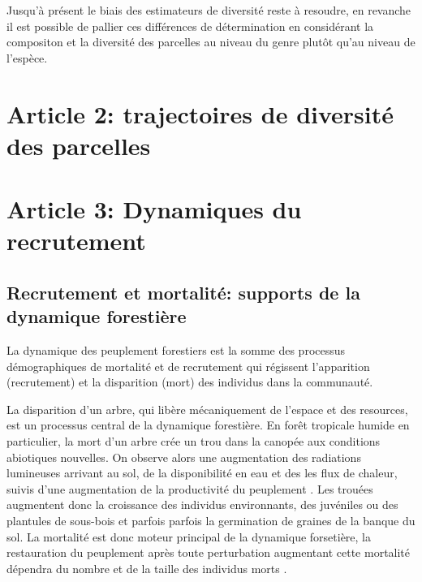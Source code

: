 \documentclass[
  11pt,
  french,
  A4paper,
  extrafontsizes,onecolumn,openright
  ]{memoir}
\begin{document}
Jusqu'à présent le biais des estimateurs de diversité reste à resoudre,
en revanche il est possible de pallier ces différences de détermination
en considérant la compositon et la diversité des parcelles au niveau du
genre plutôt qu'au niveau de l'espèce.

\chapter{Article 2: trajectoires de diversité des
parcelles}\label{article-2-trajectoires-de-diversite-des-parcelles}

\chapter{Article 3: Dynamiques du
recrutement}\label{article-3-dynamiques-du-recrutement}

\section{Recrutement et mortalité: supports de la dynamique
forestière}\label{recrutement-et-mortalite-supports-de-la-dynamique-forestiere}

La dynamique des peuplement forestiers est la somme des processus
démographiques de mortalité et de recrutement qui régissent l'apparition
(recrutement) et la disparition (mort) des individus dans la communauté.

La disparition d'un arbre, qui libère mécaniquement de l'espace et des
resources, est un processus central de la dynamique forestière. En forêt
tropicale humide en particulier, la mort d'un arbre crée un trou dans la
canopée aux conditions abiotiques nouvelles. On observe alors une
augmentation des radiations lumineuses arrivant au sol, de la
disponibilité en eau et des les flux de chaleur, suivis d'une
augmentation de la productivité du peuplement \autocite[ in Asner
2004]{Pinard2000}. Les trouées augmentent donc la croissance des
individus environnants, des juvéniles ou des plantules de sous-bois et
parfois parfois la germination de graines de la banque du sol. La
mortalité est donc moteur principal de la dynamique forsetière, la
restauration du peuplement après toute perturbation augmentant cette
mortalité dépendra du nombre et de la taille des individus morts
\autocites{Denslow1980}{Schnitzer2001}{Asner2004}.
\end{document}

